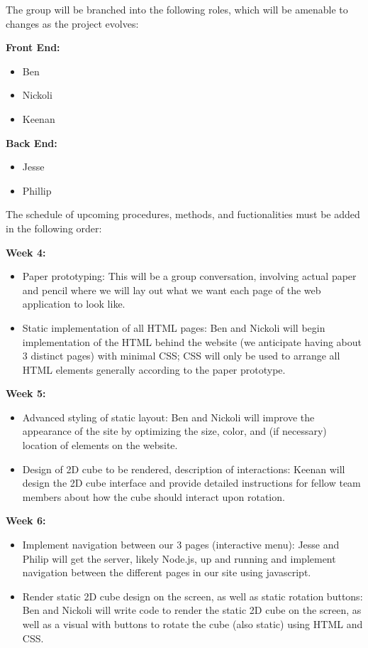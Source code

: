\documentclass[12pt]{article}
\begin{document}
\par 
The group will be branched into the following roles, which will be amenable to changes as the project evolves: \\
\par
\textbf{Front End:}
\begin{itemize}
\item Ben
\item Nickoli
\item Keenan
\end{itemize}
\par
\textbf{Back End:}
\begin{itemize}
\item Jesse
\item Phillip
\end{itemize}


\par
The schedule of upcoming procedures, methods, and fuctionalities must be added in the following order: \\

\par
\textbf{Week 4:}
\begin{itemize}
\item Paper prototyping: This will be a group conversation, involving actual paper and pencil where we will lay out what we want each page of the web application to look like.
\item Static implementation of all HTML pages: Ben and Nickoli will begin implementation of the HTML behind the website (we anticipate having about 3 distinct pages) with minimal CSS; CSS will only be used to arrange all HTML elements generally according to the paper prototype.
\end{itemize}

\textbf{Week 5:}
\begin{itemize}
\item Advanced styling of static layout: Ben and Nickoli will improve the appearance of the site by optimizing the size, color, and (if necessary) location of elements on the website.
\item Design of 2D cube to be rendered, description of interactions: Keenan will design the 2D cube interface and provide detailed instructions for fellow team members about how the cube should interact upon rotation.
\end{itemize}

\textbf{Week 6:}
\begin{itemize}
\item Implement navigation between our 3 pages (interactive menu): Jesse and Philip will get the server, likely Node.js, up and running and implement navigation between the different pages in our site using javascript.
\item Render static 2D cube design on the screen, as well as static rotation buttons: Ben and Nickoli will write code to render the static 2D cube on the screen, as well as a visual with buttons to rotate the cube (also static) using HTML and CSS.
\end{itemize}
\end{document}
